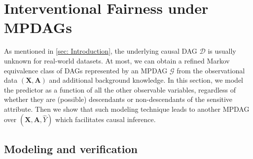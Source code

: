 \documentclass{article} %
\begin{document}
\section{Interventional Fairness under MPDAGs} \label{sec: Fairness under MPDAGs}

As mentioned in \cref{sec: Introduction}, the underlying causal DAG $\mathcal{D}$ is usually unknown for real-world datasets. At most, we can obtain a refined Markov equivalence class of DAGs represented by an MPDAG $\mathcal{G}$ from the observational data $(\mathbf{X}, \mathbf{A})$ and additional background knowledge. In this section, we model the predictor as a function of all the other observable variables, regardless of whether they are (possible) descendants or non-descendants of the sensitive attribute. Then we show that such modeling technique leads to another MPDAG over $(\mathbf{X}, \mathbf{A}, \hat{Y})$ which facilitates causal inference.

\subsection{Modeling and verification} \label{sec: Modeling and verification}

\end{document}
